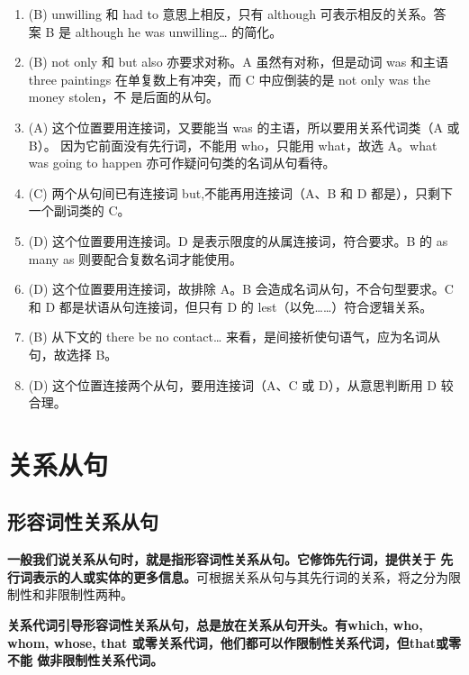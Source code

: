 \begin{enumerate}
\item (B) unwilling 和 had to 意思上相反，只有 although 可表示相反的关系。答
  案 B 是 although he was unwilling… 的简化。

\item (B) not only 和 but also 亦要求对称。A 虽然有对称，但是动词 was 和主语 three
  paintings 在单复数上有冲突，而 C 中应倒装的是 not only was the money stolen，不
  是后面的从句。


\item (A) 这个位置要用连接词，又要能当 was 的主语，所以要用关系代词类（A 或 B）。
  因为它前面没有先行词，不能用 who，只能用 what，故选 A。what was going to
  happen 亦可作疑问句类的名词从句看待。

\item  (C) 两个从句间已有连接词 but,不能再用连接词（A、B 和 D 都是），只剩下一个副词类的 C。

\item (D) 这个位置要用连接词。D 是表示限度的从属连接词，符合要求。B 的 as many as 则要配合复数名词才能使用。
\item (D) 这个位置要用连接词，故排除 A。B 会造成名词从句，不合句型要求。C 和 D 都是状语从句连接词，但只有 D 的 lest（以免……）符合逻辑关系。
\item (B) 从下文的 there be no contact… 来看，是间接祈使句语气，应为名词从句，故选择 B。

\item (D) 这个位置连接两个从句，要用连接词（A、C 或 D），从意思判断用 D 较合理。
\end{enumerate}


\chapter{关系从句}

\section{形容词性关系从句}

\textbf{一般我们说关系从句时，就是指形容词性关系从句。它修饰先行词，提供关于
  先行词表示的人或实体的更多信息。}可根据关系从句与其先行词的关系，将之分为限
制性和非限制性两种。

\textbf{关系代词引导形容词性关系从句，总是放在关系从句开头。有which, who,
  whom, whose, that 或零关系代词，他们都可以作限制性关系代词，但that或零不能
  做非限制性关系代词。}

